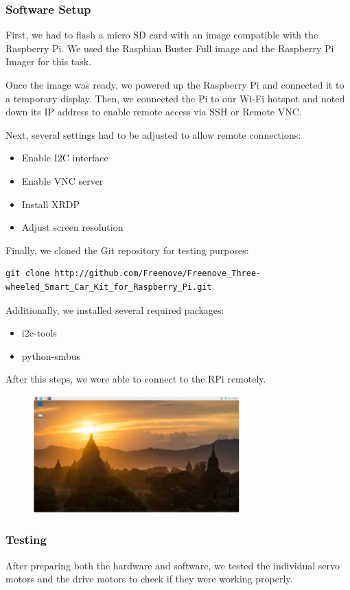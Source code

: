 \subsubsection{Software Setup}

First, we had to flash a micro SD card with an image compatible with the Raspberry Pi. We used the Raspbian Buster Full image and the Raspberry Pi Imager for this task.

Once the image was ready, we powered up the Raspberry Pi and connected it to a temporary display. Then, we connected the Pi to our Wi-Fi hotspot and noted down its IP address to enable remote access via SSH or Remote VNC.

Next, several settings had to be adjusted to allow remote connections:
\begin{itemize}
    \item Enable I2C interface
    \item Enable VNC server
    \item Install XRDP
    \item Adjust screen resolution
\end{itemize}

Finally, we cloned the Git repository for testing purposes:
\begin{verbatim}
git clone http://github.com/Freenove/Freenove_Three-wheeled_Smart_Car_Kit_for_Raspberry_Pi.git
\end{verbatim}

Additionally, we installed several required packages:
\begin{itemize}
    \item i2c-tools
    \item python-smbus
\end{itemize}

After this steps, we were able to connect to the RPi remotely.
\begin{figure}[H]
    \includegraphics[width=8cm]{img/buster_desktop_background}
\end{figure}


\subsubsection{Testing}
After preparing both the hardware and software, we tested the individual servo motors and the drive motors to check if they were working properly.

